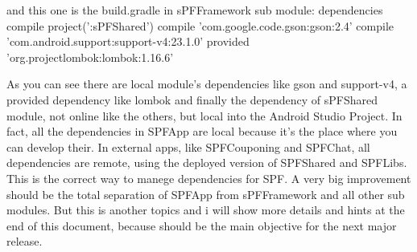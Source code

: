 and this one is the build.gradle in sPFFramework sub module:
dependencies {
    compile project(':sPFShared')
    compile 'com.google.code.gson:gson:2.4'
    compile 'com.android.support:support-v4:23.1.0'
    provided 'org.projectlombok:lombok:1.16.6'
}

As you can see there are local module's dependencies like gson and support-v4, a provided dependency like lombok  and finally the dependency of sPFShared module, not online like the others, but local into the Android Studio Project. In fact, all the dependencies in SPFApp are local because it's the place where you can develop their. In external apps, like SPFCouponing and SPFChat, all dependencies are remote, using the deployed version of SPFShared and SPFLibs. This is the correct way to manege dependencies for SPF.
A very big improvement should be the total separation of SPFApp from sPFFramework and all other sub modules. But this is another topics and i will show more details and hints at the end of this document, because should be the main objective for the next major release.


